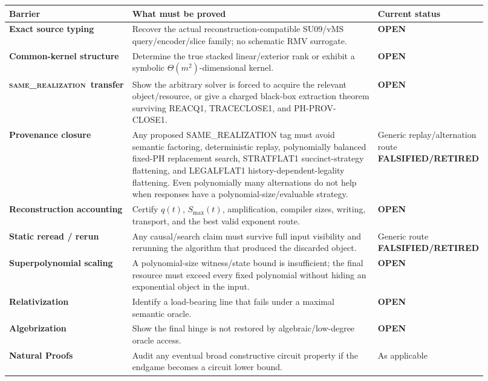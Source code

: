 \documentclass[11pt]{article}
\newcommand{\statusopen}{\textcolor{openstatus}{\textbf{OPEN}}}
\newcommand{\statusretired}{\textcolor{retired}{\textbf{FALSIFIED/RETIRED}}}
\newcommand{\same}{\textnormal{\textsc{same\_realization}}}
\begin{document}
\begin{longtable}{>{\bfseries}p{0.21\linewidth} p{0.52\linewidth} p{0.19\linewidth}}
\toprule
Barrier & What must be proved & Current status \\
\midrule
Exact source typing &
Recover the actual reconstruction-compatible SU09/vMS query/encoder/slice family; no schematic RMV
surrogate. & \statusopen \\

Common-kernel structure &
Determine the true stacked linear/exterior rank or exhibit a symbolic
\(\Theta(m^2)\)-dimensional kernel. & \statusopen \\

\same\ transfer &
Show the arbitrary solver is forced to acquire the relevant object/resource, or give a charged
black-box extraction theorem surviving REACQ1, TRACECLOSE1, and PH-PROV-CLOSE1. & \statusopen \\

Provenance closure &
Any proposed SAME\_REALIZATION tag must avoid semantic factoring, deterministic replay,
polynomially balanced fixed-PH replacement search, STRATFLAT1 succinct-strategy flattening, and LEGALFLAT1 history-dependent-legality flattening.
Even polynomially many alternations do not help when responses have a polynomial-size/evaluable
strategy. & Generic replay/alternation route \statusretired \\

Reconstruction accounting &
Certify \(q(t)\), \(S_{\max}(t)\), amplification, compiler sizes, writing, transport, and the best
valid exponent route. & \statusopen \\

Static reread / rerun &
Any causal/search claim must survive full input visibility and rerunning the algorithm that produced
the discarded object. & Generic route \statusretired \\

Superpolynomial scaling &
A polynomial-size witness/state bound is insufficient; the final resource must exceed every fixed
polynomial without hiding an exponential object in the input. & \statusopen \\

Relativization &
Identify a load-bearing line that fails under a maximal semantic oracle. & \statusopen \\

Algebrization &
Show the final hinge is not restored by algebraic/low-degree oracle access. & \statusopen \\

Natural Proofs &
Audit any eventual broad constructive circuit property if the endgame becomes a circuit lower bound. &
As applicable \\
\bottomrule
\end{longtable}
\end{document}
